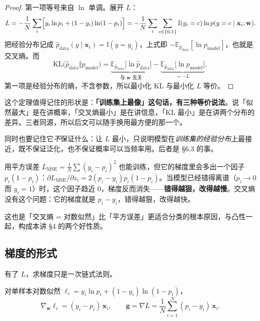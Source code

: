 \documentclass[11pt,a4paper,fontset=windows,zihao=-4]{ctexart}
\newcommand{\bw}{\mathbf{w}}
\newcommand{\bx}{\mathbf{x}}
\newcommand{\bg}{\mathbf{g}}
\begin{document}
\begin{proof}
第一项等号来自 $\ln$ 单调。展开 $L$：
\[
  L=-\frac1N\sum_{i}\Bigl[y_i\ln p_i+(1-y_i)\ln(1-p_i)\Bigr]
  =-\frac1N\sum_i\sum_{c\in\{0,1\}}\mathbb{I}(y_i=c)\ln p(y=c\mid\bx_i;\bw).
\]
把经验分布记成 $\hat p_{\text{data}}(y\mid\bx_i)=\mathbb{I}(y=y_i)$，上式即 $-\mathbb{E}_{\hat p_{\text{data}}}[\ln p_{\text{model}}]$，也就是交叉熵。而
\[
  \mathrm{KL}\bigl(\hat p_{\text{data}}\Vert p_{\text{model}}\bigr)
  =\underbrace{\mathbb{E}_{\hat p_{\text{data}}}\bigl[\ln\hat p_{\text{data}}\bigr]}_{\text{与 }\bw\text{ 无关}}
  -\underbrace{\mathbb{E}_{\hat p_{\text{data}}}\bigl[\ln p_{\text{model}}\bigr]}_{=-L},
\]
第一项是经验分布的熵，不含参数，所以最小化 KL 与最小化 $L$ 等价。
\end{proof}

这个定理值得记住的形状是：\textbf{「训练集上最像」这句话，有三种等价说法}。说「似然最大」是在讲概率，「交叉熵最小」是在讲信息，「KL 最小」是在讲两个分布的差异。三者同源，所以后文可以随手换用最方便的那一个。

同时也要记住它\emph{不}保证什么：让 $L$ 最小，只说明模型在\emph{训练集的经验分布}上最接近，既不保证泛化，也不保证概率可以当频率用。后者是 \S6.3 的事。

\begin{add}[为什么不是均方误差]
用平方误差 $L_{\text{MSE}}=\frac1N\sum(y_i-p_i)^2$ 也能训练，但它的梯度里会多出一个因子 $p_i(1-p_i)$：$\partial L_{\text{MSE}}/\partial z_i=2(p_i-y_i)p_i(1-p_i)$。当模型已经错得离谱（$p_i\to0$ 而 $y_i=1$）时，这个因子趋近 $0$，梯度反而消失——\textbf{错得越狠，改得越慢}。交叉熵没有这个问题：它的梯度就是 $p_i-y_i$，错得越狠，改得越快。

这也是「交叉熵 = 对数似然」比「平方误差」更适合分类的根本原因，与凸性一起，构成本讲 \S4 的两个好性质。
\end{add}

\subsection{梯度的形式}

有了 $L$，求梯度只是一次链式法则。

\begin{prop}[梯度是「残差 × 特征」]
对单样本对数似然 $\ell_i=y_i\ln p_i+(1-y_i)\ln(1-p_i)$，
\begin{equation}
  \nabla_{\bw}\ell_i=(y_i-p_i)\,\bx_i,\qquad
  \bg=\nabla L=\frac1N\sum_{i=1}^{N}(p_i-y_i)\,\bx_i .
  \label{eq:grad}
\end{equation}
\end{prop}
\end{document}
